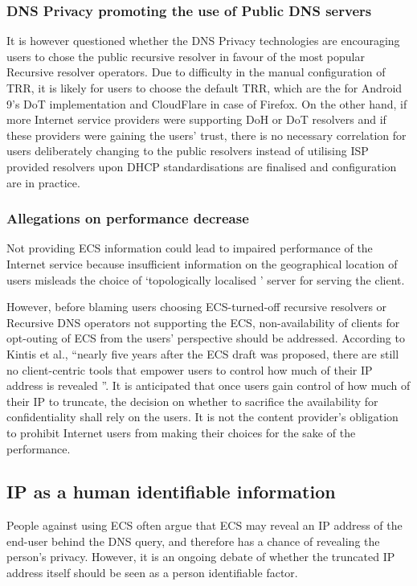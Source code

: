\subsubsection{DNS Privacy promoting the use of Public DNS servers}
It is however questioned whether the DNS Privacy technologies are encouraging users to chose the public recursive resolver in favour of the most popular Recursive resolver operators.
Due to difficulty in the manual configuration of TRR, it is likely for users to choose the default TRR, which are the \cite{dnsprivacy-test-servers} for Android 9's DoT implementation \cite{android-pie-dot} and CloudFlare in case of Firefox.
On the other hand, if more Internet service providers were supporting DoH or DoT resolvers and if these providers were gaining the users' trust, there is no necessary correlation for users deliberately changing to the public resolvers instead of utilising ISP provided resolvers upon DHCP standardisations \cite{peterson-doh-dhcp-00, peterson-dot-dhcp-00} are finalised and configuration are in practice.

\subsubsection{Allegations on performance decrease}
Not providing ECS information could lead to impaired performance of the Internet service because insufficient information on the geographical location of users misleads the choice of `topologically localised \cite{kintis2016understanding}' server for serving the client.

However, before blaming users choosing ECS-turned-off recursive resolvers or Recursive DNS operators not supporting the ECS, non-availability of clients for opt-outing of ECS from the users' perspective should be addressed.
According to Kintis et al., ``nearly five years after the ECS draft was proposed, there are still no client-centric tools that empower users to control how much of their IP address is revealed \cite{kintis2016understanding}''.
It is anticipated that once users gain control of how much of their IP to truncate, the decision on whether to sacrifice the availability for confidentiality shall rely on the users. It is not the content provider's obligation to prohibit Internet users from making their choices for the sake of the performance.

\subsection{IP as a human identifiable information}
People against using ECS often argue that ECS may reveal an IP address of the end-user behind the DNS query, and therefore has a chance of revealing the person's privacy.
However, it is an ongoing debate of whether the truncated IP address itself should be seen as a person identifiable factor.

